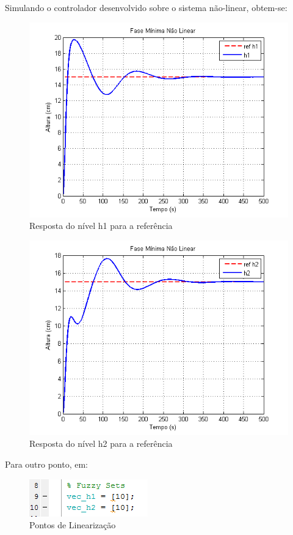 \documentclass[11pt,]{article}
\begin{document}
	Simulando o controlador desenvolvido sobre o sistema não-linear, obtem-se:
	\begin{figure}[H]
		\centering
		\includegraphics[scale=1]{h1_lin05_nm.png}
		\caption{Resposta do nível h1 para a referência}
		\label{H1_lin05_nm}
	\end{figure}
	\begin{figure}[H]
		\centering
		\includegraphics[scale=1]{h2_lin05_nm.png}
		\caption{Resposta do nível h2 para a referência}
		\label{H2_lin05_nm}
	\end{figure}
	
	Para outro ponto, em:
	\begin{figure}[H]
		\centering
		\includegraphics[scale=1]{cod_fuz_10.png}
		\caption{Pontos de Linearização}
		\label{CodigoLin10}
	\end{figure}
	
\end{document}
